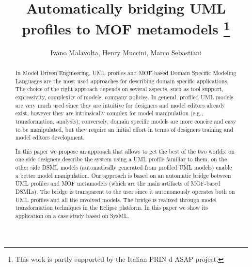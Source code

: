 \documentclass[orivec]{llncs}
\begin{document}
\title{{Automatically bridging UML profiles to MOF metamodels}
\thanks{This work is partly supported by the Italian PRIN d-ASAP project.}}


\author{Ivano Malavolta, Henry Muccini, Marco Sebastiani}

\maketitle

\begin{abstract}
In Model Driven Engineering, UML profiles and MOF-based Domain Specific Modeling Languages are the most used approaches for describing domain specific applications.
The choice of the right approach depends on several aspects, such as tool support, expressivity, complexity of models, company policies. In general, profiled UML models are very much used since they are intuitive for designers and model editors already exist, however they are intrinsically complex for model manipulation (e.g., transformation, analysis); conversely, domain specific models are more concise and easy to be manipulated, but they require an initial effort in terms of designers training and model editors development.

In this paper we propose an approach that allows to get the best of the two worlds:
on one side designers describe the system using a UML profile familiar to them, on the other side DSML models (automatically generated from profiled UML models) enable a better model manipulation. Our approach is based on an automatic bridge between UML profiles and MOF metamodels (which are the main artifacts of MOF-based DSMLs). The bridge is transparent to the user since it autonomously operates both on UML profiles
and all the involved models. The bridge is realized through model transformation techniques in the Eclipse platform. In this paper we show its application on a case study based on SysML.



\end{abstract}
\end{document}
